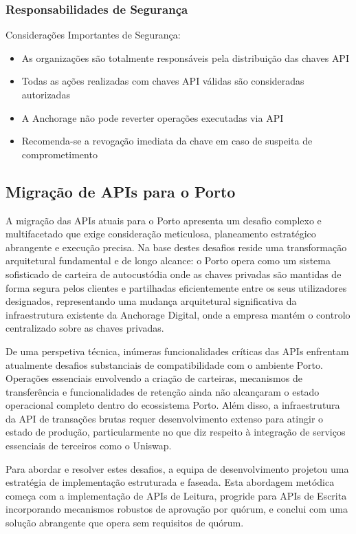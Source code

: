 \subsubsection{Responsabilidades de Segurança}
Considerações Importantes de Segurança:
\begin{itemize}
\item As organizações são totalmente responsáveis pela distribuição das chaves API
\item Todas as ações realizadas com chaves API válidas são consideradas autorizadas
\item A Anchorage não pode reverter operações executadas via API
\item Recomenda-se a revogação imediata da chave em caso de suspeita de comprometimento
\end{itemize}

\subsection*{Migração de APIs para o Porto}

A migração das APIs atuais para o Porto apresenta um desafio complexo e multifacetado que exige consideração meticulosa, planeamento estratégico abrangente e execução precisa. Na base destes desafios reside uma transformação arquitetural fundamental e de longo alcance: o Porto opera como um sistema sofisticado de carteira de autocustódia onde as chaves privadas são mantidas de forma segura pelos clientes e partilhadas eficientemente entre os seus utilizadores designados, representando uma mudança arquitetural significativa da infraestrutura existente da Anchorage Digital, onde a empresa mantém o controlo centralizado sobre as chaves privadas.

De uma perspetiva técnica, inúmeras funcionalidades críticas das APIs enfrentam atualmente desafios substanciais de compatibilidade com o ambiente Porto. Operações essenciais envolvendo a criação de carteiras, mecanismos de transferência e funcionalidades de retenção ainda não alcançaram o estado operacional completo dentro do ecossistema Porto. Além disso, a infraestrutura da API de transações brutas requer desenvolvimento extenso para atingir o estado de produção, particularmente no que diz respeito à integração de serviços essenciais de terceiros como o Uniswap.

Para abordar e resolver estes desafios, a equipa de desenvolvimento projetou uma estratégia de implementação estruturada e faseada. Esta abordagem metódica começa com a implementação de APIs de Leitura, progride para APIs de Escrita incorporando mecanismos robustos de aprovação por quórum, e conclui com uma solução abrangente que opera sem requisitos de quórum.

